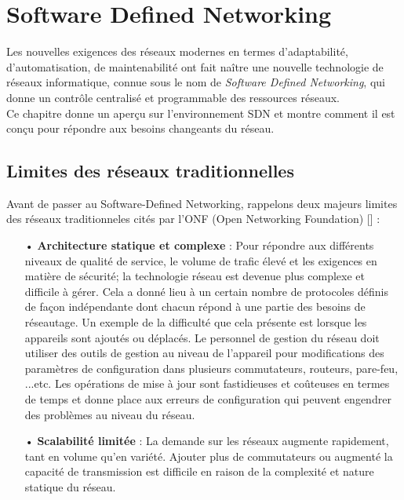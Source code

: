 \mainmatter
\chapter{Software Defined Networking} 

\label{Chapter1} 

Les nouvelles exigences des réseaux modernes en termes d’adaptabilité, d’automatisation, de maintenabilité ont fait naître une nouvelle technologie de réseaux informatique, connue sous le nom de \textit{Software Defined Networking}, qui donne un contrôle centralisé et programmable des ressources réseaux.\\
Ce chapitre donne un aperçu sur l’environnement SDN et montre comment il est conçu  pour répondre aux besoins changeants du réseau.

\section{Limites des réseaux traditionnelles}
Avant de passer au Software-Defined Networking, rappelons deux majeurs limites des réseaux traditionneles cités par l'ONF (Open Networking Foundation) [\cite{1}] :\\
\begin{itemize}
\item[•] \textbf{Architecture statique et complexe} : Pour répondre aux différents niveaux de qualité de service, le volume de trafic élevé et les exigences en matière de sécurité; la technologie réseau est devenue plus complexe et difficile à gérer. Cela a donné lieu à un certain nombre de protocoles définis de façon indépendante dont chacun répond à une partie des besoins de réseautage. Un exemple de la difficulté que cela présente est lorsque les appareils sont ajoutés ou déplacés. Le personnel de gestion du réseau doit utiliser des outils de gestion au niveau de l’appareil pour modifications des paramètres de configuration dans plusieurs commutateurs, routeurs, pare-feu, ...etc. Les opérations de mise à jour sont fastidieuses et coûteuses en termes de temps et donne place aux erreurs de configuration qui peuvent engendrer des problèmes au niveau du réseau.\\
\item[•] \textbf{Scalabilité limitée} : La demande sur les réseaux augmente rapidement, tant en volume qu’en variété. Ajouter plus de commutateurs ou augmenté la capacité de transmission est difficile en raison de la complexité et nature statique du réseau.
\end{itemize}

